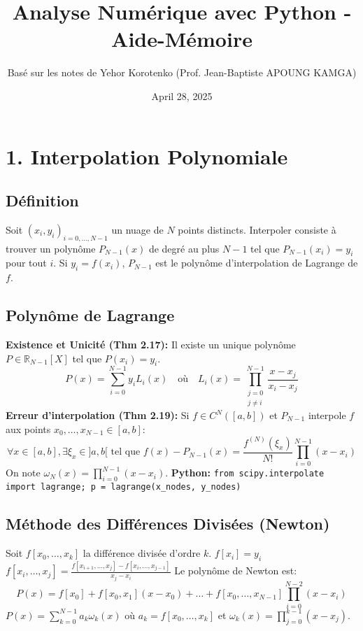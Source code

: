 \documentclass[10pt,a4paper]{article}
\title{Analyse Numérique avec Python - Aide-Mémoire}
\author{Basé sur les notes de Yehor Korotenko (Prof. Jean-Baptiste APOUNG KAMGA)}
\date{April 28, 2025}
\newcommand{\R}{\mathbb{R}}
\begin{document}
\maketitle
\thispagestyle{empty}
\newpage

\section*{1. Interpolation Polynomiale}

\subsection*{Définition}
Soit $(x_i, y_i)_{i=0,\dots,N-1}$ un nuage de $N$ points distincts. Interpoler consiste à trouver un polynôme $P_{N-1}(x)$ de degré au plus $N-1$ tel que $P_{N-1}(x_i) = y_i$ pour tout $i$.
Si $y_i = f(x_i)$, $P_{N-1}$ est le polynôme d'interpolation de Lagrange de $f$.

\subsection*{Polynôme de Lagrange}
\textbf{Existence et Unicité (Thm 2.17):} Il existe un unique polynôme $P \in \R_{N-1}[X]$ tel que $P(x_i)=y_i$.
\begin{equation*}
    P(x) = \sum_{i=0}^{N-1} y_i L_i(x) \quad \text{où} \quad L_i(x) = \prod_{\substack{j=0 \\ j \neq i}}^{N-1} \frac{x-x_j}{x_i-x_j}
\end{equation*}
\textbf{Erreur d'interpolation (Thm 2.19):} Si $f \in C^N([a,b])$ et $P_{N-1}$ interpole $f$ aux points $x_0, \dots, x_{N-1} \in [a,b]$:
\begin{equation*}
    \forall x \in [a,b], \exists \xi_x \in ]a,b[ \text{ tel que } f(x) - P_{N-1}(x) = \frac{f^{(N)}(\xi_x)}{N!} \prod_{i=0}^{N-1} (x-x_i)
\end{equation*}
On note $\omega_N(x) = \prod_{i=0}^{N-1} (x-x_i)$.
\textbf{Python:} \texttt{from scipy.interpolate import lagrange; p = lagrange(x\_nodes, y\_nodes)}

\subsection*{Méthode des Différences Divisées (Newton)}
Soit $f[x_0, \dots, x_k]$ la différence divisée d'ordre $k$.
$f[x_i] = y_i$
$f[x_i, \dots, x_j] = \frac{f[x_{i+1}, \dots, x_j] - f[x_i, \dots, x_{j-1}]}{x_j - x_i}$
Le polynôme de Newton est:
\begin{equation*}
    P(x) = f[x_0] + f[x_0,x_1](x-x_0) + \dots + f[x_0,\dots,x_{N-1}]\prod_{i=0}^{N-2}(x-x_i)
\end{equation*}
$P(x) = \sum_{k=0}^{N-1} a_k \omega_k(x)$ où $a_k = f[x_0, \dots, x_k]$ et $\omega_k(x) = \prod_{j=0}^{k-1} (x-x_j)$.
\end{document}
